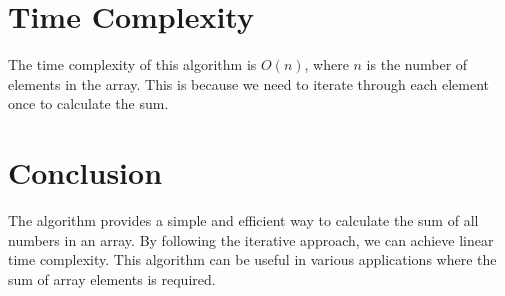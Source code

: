 \documentclass{article}
\begin{document}
\section*{Time Complexity}

The time complexity of this algorithm is \(O(n)\), where \(n\) is the number of elements in the array. This is because we need to iterate through each element once to calculate the sum.

\section*{Conclusion}

The algorithm provides a simple and efficient way to calculate the sum of all numbers in an array. By following the iterative approach, we can achieve linear time complexity. This algorithm can be useful in various applications where the sum of array elements is required.
\end{document}
